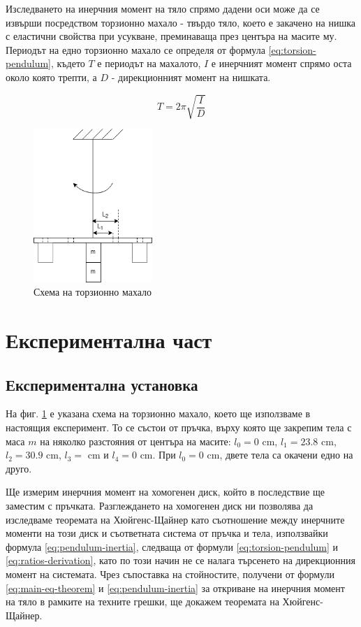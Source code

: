 \documentclass[12pt]{article}
\begin{document}
Изследването на инерчния момент на тяло спрямо дадени оси може да се извърши посредством торзионно махало - твърдо тяло, което е закачено на нишка с еластични свойства при усукване, преминаваща през центъра на масите му. Периодът на едно торзионно махало се определя от формула \ref{eq:torsion-pendulum}, където $T$ е периодът на махалото, $I$ е инерчният момент спрямо оста около която трепти, а $D$ - дирекционният момент на нишката.  

\begin{equation}\label{eq:torsion-pendulum}
    T = 2\pi \sqrt{\frac{I}{D}}
\end{equation}

\begin{figure}
    \centering
    \includegraphics[width=0.4\textwidth]{images/parallel-axis-theorem.drawio.png}
    \caption{Схема на торзионно махало}
    \label{fig:setup}
\end{figure}

\section{Експериментална част}

\subsection{Експериментална установка}
На фиг. \ref{fig:setup} е указана схема на торзионно махало, което ще използваме в настоящия експеримент. То се състои от пръчка, върху която ще закрепим тела с маса $m$ на няколко разстояния от центъра на масите: $l_0 = 0$ cm, $l_1 = 23.8$ cm, $l_2 = 30.9$ cm, $l_3 = $ cm и $l_4 = 0$ cm. При $l_0 = 0$ cm, двете тела са окачени едно на друго.

Ще измерим инерчния момент на хомогенен диск, който в последствие ще заместим с пръчката. Разглеждането на хомогенен диск ни позволява да изследваме теоремата на Хюйгенс-Щайнер като съотношение между инерчните моменти на този диск и съответната система от пръчка и тела, използвайки формула \ref{eq:pendulum-inertia}, следваща от формули \ref{eq:torsion-pendulum} и \ref{eq:ratios-derivation}, като по този начин не се налага търсенето на дирекционния момент на системата. Чрез съпоставка на стойностите, получени от формули \ref{eq:main-eq-theorem} и \ref{eq:pendulum-inertia} за откриване на инерчния момент на тяло в рамките на техните грешки, ще докажем теоремата на Хюйгенс-Щайнер.
\end{document}
